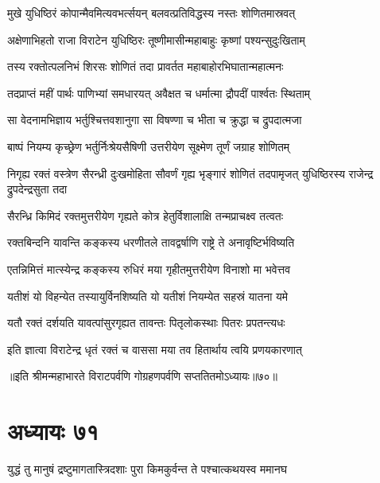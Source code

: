 \twolineshloka
{मुखे युधिष्ठिरं कोपान्मैवमित्यवभर्त्सयन्}
{बलवत्प्रतिविद्धस्य नस्तः शोणितमास्रवत्}


\twolineshloka
{अक्षेणाभिहतो राजा विराटेन युधिष्ठिरः}
{तूष्णीमासीन्महाबाहुः कृष्णां पश्यन्सुदुःखिताम्}


\twolineshloka
{तस्य रक्तोत्पलनिभं शिरसः शोणितं तदा}
{प्रावर्तत महाबाहोरभिघातान्महात्मनः}


\twolineshloka
{तदप्राप्तं महीं पार्थः पाणिभ्यां समधारयत्}
{अवैक्षत च धर्मात्मा द्रौपदीं पार्श्वतः स्थिताम्}


\twolineshloka
{सा वेदनामभिज्ञाय भर्तुश्चित्तवशानुगा}
{सा विषण्णा च भीता च क्रुद्धा च द्रुपदात्मजा}


\twolineshloka
{बाष्पं नियम्य कृच्छ्रेण भर्तुर्निःश्रेयसैषिणी}
{उत्तरीयेण सूक्ष्मेण तूर्णं जग्राह शोणितम्}


\threelineshloka
{निगृह्य रक्तं वस्त्रेण सैरन्ध्री दुःखमोहिता}
{सौवर्णं गृह्य भृङ्गारं शोणितं तदपामृजत्}
{युधिष्ठिरस्य राजेन्द्र द्रुपदेन्द्रसुता तदा}




\twolineshloka
{सैरन्ध्रि किमिदं रक्तमुत्तरीयेण गृह्यते}
{कोत्र हेतुर्विशालाक्षि तन्मप्राचक्ष्व तत्वतः}




\twolineshloka
{रक्तबिन्दनि यावन्ति कङ्कस्य धरणीतले}
{तावद्वर्षाणि राष्ट्रे ते अनावृष्टिर्भविष्यति}


\twolineshloka
{एतन्निमित्तं मात्स्येन्द्र कङ्कस्य रुधिरं मया}
{गृहीतमुत्तरीयेण विनाशो मा भवेत्तव}


\twolineshloka
{यतीशं यो विहन्येत तस्यायुर्विनशिष्यति}
{यो यतीशं नियम्येत सहस्रं यातना यमे}


\twolineshloka
{यतौ रक्तं दर्शयति यावत्पांसुरगृह्यत}
{तावन्तः पितृलोकस्थाः पितरः प्रपतन्त्यधः}


\twolineshloka
{इति ज्ञात्वा विराटेन्द्र धृतं रक्तं च वाससा}
{मया तव हितार्थाय त्वयि प्रणयकारणात्}

॥इति श्रीमन्महाभारते विराटपर्वणि गोग्रहणपर्वणि सप्ततितमोऽध्यायः॥७०॥

\chapter{अध्यायः ७१}

\twolineshloka
{युद्धं तु मानुषं द्रष्टुमागतास्त्रिदशाः पुरा}
{किमकुर्वन्त ते पश्चात्कथयस्व ममानघ}



